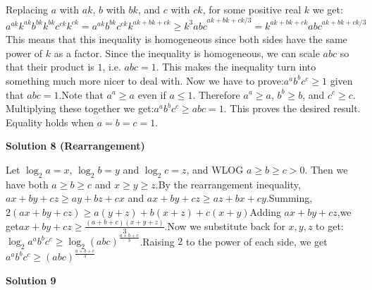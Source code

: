 \begin{enumerate}
Replacing $a$ with $ak$, $b$ with $bk$, and $c$ with $ck$, for some positive real $k$ we get:$a^{ak}k^{ak}b^{bk}k^{bk}c^{ck}k^{ck} = a^{ak}b^{bk}c^{ck}k^{ak+bk+ck} \ge {k^3abc}^{{ak+bk+ck}/3} = k^{ak+bk+ck}{abc}^{{ak+bk+ck}/3}$This means that this inequality is homogeneous since both sides have the same power of $k$ as a factor. Since the inequality is homogeneous, we can scale $abc$ so that their product is $1$, i.e. $abc = 1$. This makes the inequality turn into something much more nicer to deal with. Now we have to prove:$a^ab^bc^c \ge 1$ given that $abc = 1$.Note that $a^a \ge a$ even if $a \le 1$. Therefore $a^a \ge a$, $b^b \ge b$, and $c^c \ge c$. Multiplying these together we get:$a^ab^bc^c \ge abc = 1$. This proves the desired result. Equality holds when $a = b = c = 1$.

 



\textbf{Solution 8 (Rearrangement)}

Let $\log_2a=x$, $\log_2b=y$ and $\log_2c=z$, and WLOG $a\ge b\ge c >0$. Then we have both $a\ge b\ge c$ and $x\ge y \ge z$.By the rearrangement inequality, $ax+by+cz\ge ay + bz +cx$ and $ax+by +cz\ge az+bx+cy$.Summing, $2(ax+by+cz)\ge a(y+z)+b(x+z)+c(x+y)$Adding $ax+by+cz$,we get$ax+by+cz\ge \frac{(a+b+c)(x+y+z)}{3}$.Now we substitute back for $x,y,z$ to get:$\log_2a^ab^bc^c\ge \log_2(abc)^{\frac{a+b+c}{3}}$.Raising $2$ to the power of each side, we get$a^ab^bc^c\ge (abc)^{\frac{a+b+c}{3}}$




\textbf{Solution 9}


\end{enumerate}
